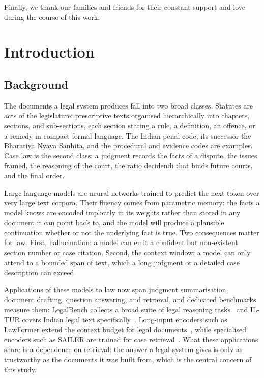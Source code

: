 \documentclass{mnnit}
\begin{document}
Finally, we thank our families and friends for their constant
support and love during the course of this work.

\afterpreface

\chapter{Introduction}

\section{Background}

The documents a legal system produces fall into two broad
classes. Statutes are acts of the legislature: prescriptive
texts organised hierarchically into chapters, sections, and
sub-sections, each section stating a rule, a definition, an
offence, or a remedy in compact formal language. The Indian
penal code, its successor the Bharatiya Nyaya Sanhita, and the
procedural and evidence codes are examples. Case law is the
second class: a judgment records the facts of a dispute, the
issues framed, the reasoning of the court, the ratio decidendi
that binds future courts, and the final order.

Large language models are neural networks trained to predict
the next token over very large text corpora. Their fluency comes
from parametric memory: the facts a model knows are encoded
implicitly in its weights rather than stored in any document it
can point back to, and the model will produce a plausible
continuation whether or not the underlying fact is true. Two
consequences matter for law. First, hallucination: a model can
emit a confident but non-existent section number or case
citation. Second, the context window: a model can only attend to
a bounded span of text, which a long judgment or a detailed case
description can exceed.

Applications of these models to law now span judgment
summarisation, document drafting, question answering, and
retrieval, and dedicated benchmarks measure them: LegalBench
collects a broad suite of legal reasoning
tasks~\cite{legalbench} and IL-TUR covers Indian legal text
specifically~\cite{iltur}. Long-input encoders such as
LawFormer extend the context budget for legal
documents~\cite{lawformer}, while specialised encoders such as
SAILER are trained for case retrieval~\cite{sailer}. What these
applications share is a dependence on retrieval: the answer a
legal system gives is only as trustworthy as the documents it
was built from, which is the central concern of this study.
\end{document}
